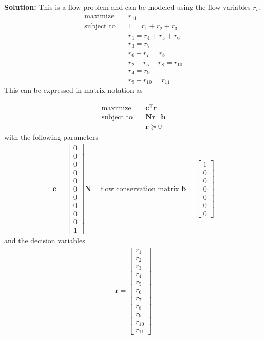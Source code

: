 \documentclass[11pt]{article}
\begin{document}
\textbf{Solution: }
This is a flow problem and can be modeled using the flow variables $r_i$.
\begin{align*}
  \text{maximize} & \quad r_{11} \\
  \text{subject to} & \quad 1 = r_1 + r_2 + r_3 \\
  & \quad r_1 = r_4 + r_5 + r_6 \\
  & \quad r_3 = r_7 \\
  & \quad r_6 + r_7 = r_8 \\
  & \quad r_2 + r_5 + r_8 = r_{10} \\
  & \quad r_4 = r_9 \\
  & \quad r_9 + r_{10} = r_{11}
\end{align*}
This can be expressed in matrix notation as

\begin{align*}
  \text{maximize} & \quad \textbf{c}^\top \textbf{r} \\
  \text{subject to} & \quad \textbf{N} \textbf{r} = \textbf{b} \\
  & \quad \textbf{r} \succeq 0
\end{align*}
with the following parameters
\begin{align*}
  \textbf{c} = 
    \begin{bmatrix}
      0 \\ 0 \\ 0 \\ 0 \\ 0 \\ 0 \\ 0 \\ 0 \\ 0 \\ 0 \\ 1
    \end{bmatrix}
    \textbf{N} = 
    \text{flow conservation matrix }
    \textbf{b} = 
    \begin{bmatrix}
      1 \\ 0 \\ 0 \\ 0 \\ 0 \\ 0 \\ 0
    \end{bmatrix}
\end{align*}
and the decision variables
\begin{align*}
  \textbf{r} = 
  \begin{bmatrix}
     r_1 \\ r_2 \\ r_3 \\ r_4 \\ r_5 \\ r_6 \\ r_7 \\ r_8 \\ r_9 \\ r_{10} \\ r_{11}
  \end{bmatrix}
\end{align*} 
\end{document}
